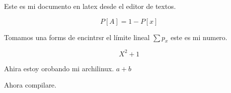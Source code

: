 \documentclass{article}
\begin{document}
Este es mi documento en latex desde el editor de textos. 

\begin{displaymath} 
 P[A] = 1 - P[x] 
\end{displaymath} 

 Tomamos una forms de encintrsr el límite lineal
 $ \sum p_x $  este es mi numero.
 
 \begin{displaymath}
    X^2 + 1
 \end{displaymath}
 
 Ahira estoy orobando mi archilinux. $a +b $ 
 
 Ahora compilare. 
\end{document}
